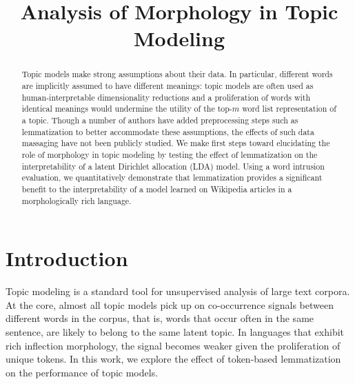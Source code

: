 \documentclass[11pt,letterpaper]{article}
\title{Analysis of Morphology in Topic Modeling}
\begin{document}
\maketitle
\begin{abstract}
    Topic models make strong assumptions about their data.  In
    particular, different words are implicitly assumed to
    have different meanings: topic models are often used as
    human-interpretable dimensionality reductions and a proliferation
    of words with identical meanings would undermine the utility of the
    top-$m$ word list representation of a topic.  Though a number
    of authors have added preprocessing steps such as lemmatization to
    better accommodate these assumptions, the effects of such data
    massaging have not been publicly studied.  We make first steps
    toward elucidating the role of morphology in topic modeling by
    testing the effect of lemmatization on the interpretability of a
    latent Dirichlet allocation (LDA) model.  Using a word intrusion
    evaluation, we quantitatively demonstrate that lemmatization
    provides a significant benefit to the interpretability of a model
    learned on Wikipedia articles in a morphologically rich language.
\end{abstract}


\section{Introduction}\label{sec:introduction}

Topic modeling is a standard tool for unsupervised analysis of large
text corpora. At the core, almost all topic models pick up on
co-occurrence signals between different words in the corpus, that is,
words that occur often in the same sentence, are likely to belong to
the same latent topic. In languages that exhibit rich inflection
morphology, the signal becomes weaker given the proliferation of
unique tokens. In this work, we explore the effect of token-based
lemmatization on the performance of topic models.
\end{document}
